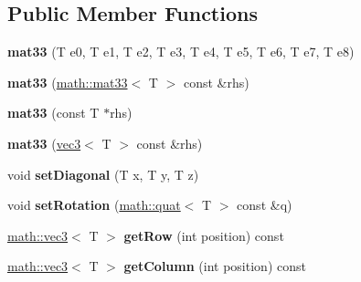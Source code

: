 \subsection*{Public Member Functions}
\begin{DoxyCompactItemize}
\item 
\hypertarget{classmath_1_1mat33_ab00020cb1e714e31f4b5d81a02e085d7}{
{\bfseries mat33} (T e0, T e1, T e2, T e3, T e4, T e5, T e6, T e7, T e8)}
\label{classmath_1_1mat33_ab00020cb1e714e31f4b5d81a02e085d7}

\item 
\hypertarget{classmath_1_1mat33_aef2112cfd5ededeeb390a91691a6f469}{
{\bfseries mat33} (\hyperlink{classmath_1_1mat33}{math::mat33}$<$ T $>$ const \&rhs)}
\label{classmath_1_1mat33_aef2112cfd5ededeeb390a91691a6f469}

\item 
\hypertarget{classmath_1_1mat33_ac084f09a588f7c9a1e8874d0b9970339}{
{\bfseries mat33} (const T $\ast$rhs)}
\label{classmath_1_1mat33_ac084f09a588f7c9a1e8874d0b9970339}

\item 
\hypertarget{classmath_1_1mat33_a0603d861a667d254189af5023032854a}{
{\bfseries mat33} (\hyperlink{classmath_1_1vec3}{vec3}$<$ T $>$ const \&rhs)}
\label{classmath_1_1mat33_a0603d861a667d254189af5023032854a}

\item 
\hypertarget{classmath_1_1mat33_a91561f2df87f6cfbac30dcc4b7d44441}{
void {\bfseries setDiagonal} (T x, T y, T z)}
\label{classmath_1_1mat33_a91561f2df87f6cfbac30dcc4b7d44441}

\item 
\hypertarget{classmath_1_1mat33_a66471f4f680e0f9e269e574ee3ff294f}{
void {\bfseries setRotation} (\hyperlink{classmath_1_1quat}{math::quat}$<$ T $>$ const \&q)}
\label{classmath_1_1mat33_a66471f4f680e0f9e269e574ee3ff294f}

\item 
\hypertarget{classmath_1_1mat33_ae141013ac49eba050977b854bfc782bd}{
\hyperlink{classmath_1_1vec3}{math::vec3}$<$ T $>$ {\bfseries getRow} (int position) const }
\label{classmath_1_1mat33_ae141013ac49eba050977b854bfc782bd}

\item 
\hypertarget{classmath_1_1mat33_af742078fad284c80d0ea6366c417ad8c}{
\hyperlink{classmath_1_1vec3}{math::vec3}$<$ T $>$ {\bfseries getColumn} (int position) const }
\label{classmath_1_1mat33_af742078fad284c80d0ea6366c417ad8c}


\end{DoxyCompactItemize}
